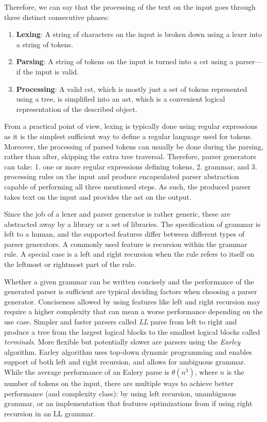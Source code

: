 Therefore, we can say that the processing of the text on the input goes through three distinct consecutive phases:

\begin{enumerate}
    \item \textbf{Lexing}: A string of characters on the input is broken down using a lexer into a string of tokens.
    \item \textbf{Parsing}: A string of tokens on the input is turned into a \gls{cst} using a parser---if the input is valid.
    \item \textbf{Processing}: A valid \gls{cst}, which is mostly just a set of tokens represented using a tree, is simplified into an \gls{ast}, which is a convenient logical representation of the described object.
\end{enumerate}

From a practical point of view, lexing is typically done using regular expressions as it is the simplest sufficient way to define a regular language used for tokens.
Moreover, the processing of parsed tokens can usually be done during the parsing, rather than after, skipping the extra tree traversal.
Therefore, parser generators can take: 1. one or more regular expressions defining tokens, 2. grammar, and 3. processing rules on the input and produce encapsulated parser abstraction capable of performing all three mentioned steps.
As such, the produced parser takes text on the input and provides the \gls{ast} on the output.

Since the job of a lexer and parser generator is rather generic, these are abstracted away by a library or a set of libraries.
The specification of grammar is left to a human, and the supported features differ between different types of parser generators.
A commonly used feature is recursion within the grammar rule.
A special case is a left and right recursion when the rule refers to itself on the leftmost or rightmost part of the rule.

Whether a given grammar can be written concisely and the performance of the generated parser is sufficient are typical deciding factors when choosing a parser generator.
Conciseness allowed by using features like left and right recursion may require a higher complexity that can mean a worse performance depending on the use case.
Simpler and faster parsers called \emph{LL} parse from left to right and produce a tree from the largest logical blocks to the smallest logical blocks called \emph{terminals}.
More flexible but potentially slower are parsers using the \emph{Earley} algorithm.
Earley algorithm uses top-down dynamic programming and enables support of both left and right recursion, and allows for ambiguous grammar.
While the average performance of an Ealery parse is $\theta(n^3)$, where $n$ is the number of tokens on the input, there are multiple ways to achieve better performance (and complexity class): by using left recursion, unambiguous grammar, or an implementation that features optimizations from \textcite{leo_general_1991} if using right recursion in an LL grammar.
